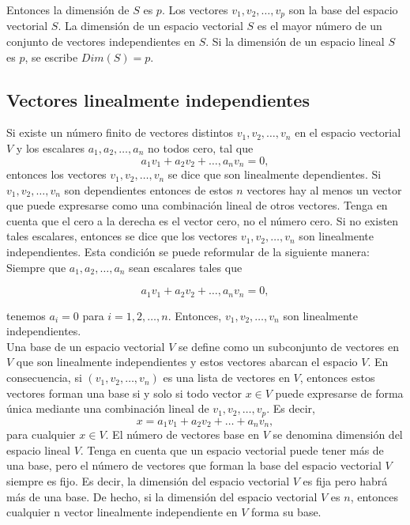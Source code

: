 Entonces la dimensión de $S$ es $p$. Los vectores $v_1, v_2, \ldots , v_p$ son la base del espacio vectorial $S$. La dimensión de un espacio vectorial $S$ es el mayor número de un conjunto de vectores independientes en $S$. Si la dimensión de un espacio lineal $S$ es $p$, se escribe $Dim(S) = p$.
 

\subsection{Vectores linealmente independientes}

Si existe un número finito de vectores distintos $v_1,v_2,\ldots,v_n$ en el espacio vectorial $V$ y los escalares $a_1,a_2,\ldots,a_n$ no todos cero, tal que
$$a_1v_1+a_2v_2+\ldots,a_nv_n=0,$$
entonces los vectores $v_1,v_2,\ldots,v_n$ se dice que son linealmente dependientes. Si $v_1,v_2,\ldots,v_n$ son dependientes entonces de estos $n$ vectores hay al menos un vector que puede expresarse como una combinación lineal de otros vectores. Tenga en cuenta que el cero a la derecha es el vector cero, no el número cero. Si no existen tales escalares, entonces se dice que los vectores $v_1, v_2, \ldots , v_n$ son linealmente independientes. Esta condición se puede reformular de la siguiente manera: Siempre que $a_1 , a_2 , \ldots , a_n$ sean escalares tales que

$$a_1v_1+a_2v_2+\ldots,a_nv_n=0,$$

tenemos $a_i=0$ para $i=1,2,\ldots,n$. Entonces, $v_1,v_2,\ldots,v_n$ son linealmente independientes.\\

Una base de un espacio vectorial $V$ se define como un subconjunto de vectores en $V$ que son linealmente independientes y estos vectores abarcan el espacio $V$. En consecuencia, si $(v_1 , v_2 , \ldots , v_n)$ es una lista de vectores en $V$, entonces estos vectores forman una base si y solo si todo vector $x \in V$ puede expresarse de forma única mediante una combinación lineal de $v_1 , v_2 , \ldots , v_p$. Es decir, 
$$x = a_1 v_1 + a_2 v_2 + \ldots + a_n v_n,$$ 
para cualquier $x \in V$. El número de vectores base en $V$ se denomina dimensión del espacio lineal $V$. Tenga en cuenta que un espacio vectorial puede tener más de una base, pero el número de vectores que forman la base del espacio vectorial $V$ siempre es fijo. Es decir, la dimensión del espacio vectorial $V$ es fija pero habrá más de una base. De hecho, si la dimensión del espacio vectorial $V$ es $n$, entonces cualquier n vector linealmente independiente en $V$ forma su base.


